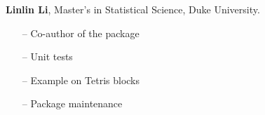 \documentclass{article}
\begin{document}
\begin{appendices}
      \textbf{Linlin Li}, Master's in Statistical Science, Duke University.
      \begin{itemize}[leftmargin = 7mm]
        \item[--] Co-author of the package
        \item[--] Unit tests
        \item[--] Example on Tetris blocks
        \item[--] Package maintenance 
      \end{itemize}
\end{appendices}
\end{document}

